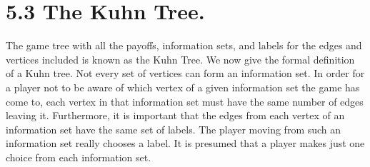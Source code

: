 \section{ 5.3 The Kuhn Tree.} The game tree with all the payoffs, information sets, and labels
for the edges and vertices included is known as the Kuhn Tree. We now give the formal
definition of a Kuhn tree.
Not every set of vertices can form an information set. In order for a player not to
be aware of which vertex of a given information set the game has come to, each vertex in
that information set must have the same number of edges leaving it. Furthermore, it is
important that the edges from each vertex of an information set have the same set of labels.
The player moving from such an information set really chooses a label. It is presumed that
a player makes just one choice from each information set.

